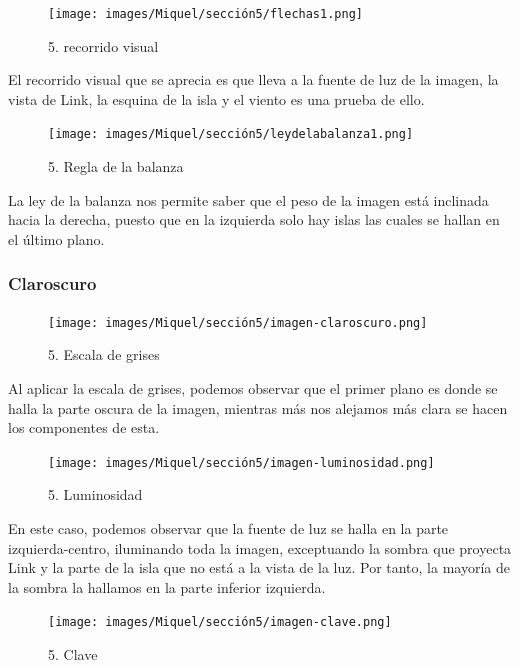 \documentclass[12pt]{article}
\begin{document}
    \begin{figure}[H]
      \centering
      \texttt{[image: images/Miquel/sección5/flechas1.png]}
      \caption{\small 5. recorrido visual}
    \end{figure}

     El recorrido visual que se aprecia es que lleva a la fuente de luz de la imagen, la vista de Link, la esquina de la isla y el viento es una prueba de ello.

    \begin{figure}[H]
      \centering
      \texttt{[image: images/Miquel/sección5/leydelabalanza1.png]}
      \caption{\small 5. Regla de la balanza}
    \end{figure}

    La ley de la balanza nos permite saber que el peso de la imagen está inclinada hacia la derecha, puesto que en la izquierda solo hay islas las cuales se hallan en el último plano.

        \subsubsection{Claroscuro}

    \begin{figure}[H]
      \centering
      \texttt{[image: images/Miquel/sección5/imagen-claroscuro.png]}
      \caption{\small 5. Escala de grises}
    \end{figure}

    Al aplicar la escala de grises, podemos observar que el primer plano es donde se halla la parte oscura de la imagen, mientras más nos alejamos más clara se hacen los componentes de esta.

    \begin{figure}[H]
      \centering
      \texttt{[image: images/Miquel/sección5/imagen-luminosidad.png]}
      \caption{\small 5. Luminosidad}
    \end{figure}

    En este caso, podemos observar que la fuente de luz se halla en la parte izquierda-centro, iluminando toda la imagen, exceptuando la sombra que proyecta Link y la parte de la isla que no está a la vista de la luz. Por tanto, la mayoría de la sombra la hallamos en la parte inferior izquierda.
    
   \begin{figure}[H]
      \centering
      \texttt{[image: images/Miquel/sección5/imagen-clave.png]}
      \caption{\small 5. Clave}
    \end{figure}
\end{document}

